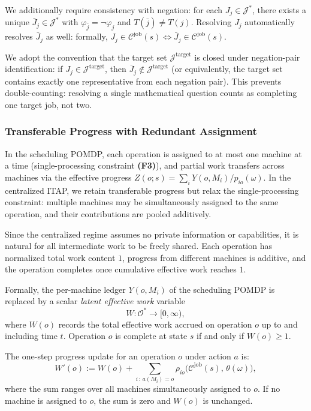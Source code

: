 We additionally require consistency with negation: for each $J_j \in \mathcal{J}^*$,
there exists a unique $\bar J_j \in \mathcal{J}^*$ with
$\varphi_{\bar j} = \neg\varphi_j$ and $T(\bar j) \neq T(j)$. Resolving $J_j$
automatically resolves $\bar J_j$ as well: formally,
$J_j \in \mathcal{C}^{\mathrm{job}}(s) \iff \bar J_j \in \mathcal{C}^{\mathrm{job}}(s)$.

\begin{remark}
We adopt the convention that the target set $\mathcal{J}^{\mathrm{target}}$ is closed
under negation-pair identification: if $J_j \in \mathcal{J}^{\mathrm{target}}$, then
$\bar J_j \notin \mathcal{J}^{\mathrm{target}}$ (or equivalently, the target set
contains exactly one representative from each negation pair). This prevents
double-counting: resolving a single mathematical question counts as completing one
target job, not two.
\end{remark}

\subsubsection{Transferable Progress with Redundant Assignment}

In the scheduling POMDP, each operation is assigned to at most one machine at a time
(single-processing constraint \textbf{(F3)}), and partial work transfers across
machines via the effective progress $Z(o; s) = \sum_i Y(o, M_i)/p_{io}(\omega)$. In
the centralized ITAP, we retain transferable progress but relax the single-processing
constraint: multiple machines may be simultaneously assigned to the same operation,
and their contributions are pooled additively.

Since the centralized regime assumes no private information or capabilities, it is
natural for all intermediate work to be freely shared. Each operation has normalized
total work content $1$, progress from different machines is additive, and the
operation completes once cumulative effective work reaches $1$.

Formally, the per-machine ledger $Y(o, M_i)$ of the scheduling POMDP is replaced by
a scalar \emph{latent effective work} variable
\[
W : \mathcal{O}^* \to [0, \infty),
\]
where $W(o)$ records the total effective work accrued on operation $o$ up to and
including time $t$. Operation $o$ is complete at state $s$ if and only if
$W(o) \ge 1$.

The one-step progress update for an operation $o$ under action $a$ is:
\[
W'(o) := W(o) + \sum_{i\,:\, a(M_i) = o}
\rho_{io}\bigl(\mathcal{C}^{\mathrm{job}}(s),\, \theta(\omega)\bigr),
\]
where the sum ranges over all machines simultaneously assigned to $o$. If no machine
is assigned to $o$, the sum is zero and $W(o)$ is unchanged.

